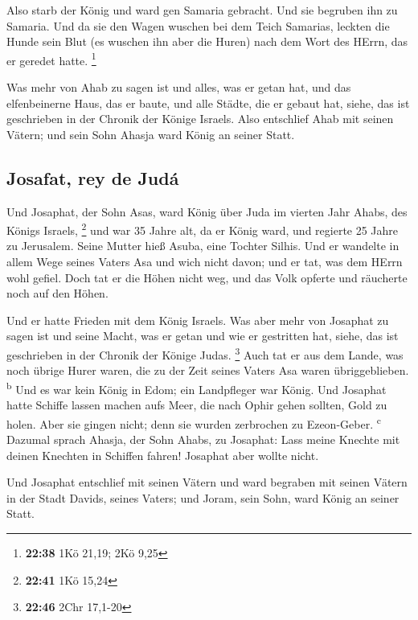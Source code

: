  Also starb der König und ward gen Samaria gebracht. Und
sie begruben ihn zu Samaria.  Und da sie den Wagen
wuschen bei dem Teich Samarias, leckten die Hunde sein Blut (es wuschen
ihn aber die Huren) nach dem Wort des HErrn, das er geredet hatte.
\footnote{\textbf{22:38} 1Kö 21,19; 2Kö 9,25}

 Was mehr von Ahab zu sagen ist und alles, was er getan
hat, und das elfenbeinerne Haus, das er baute, und alle Städte, die er
gebaut hat, siehe, das ist geschrieben in der Chronik der Könige
Israels.  Also entschlief Ahab mit seinen Vätern; und
sein Sohn Ahasja ward König an seiner Statt.

\hypertarget{josafat-rey-de-juduxe1}{%
\subsection{Josafat, rey de Judá}\label{josafat-rey-de-juduxe1}}

 Und Josaphat, der Sohn Asas, ward König über Juda im
vierten Jahr Ahabs, des Königs Israels, \footnote{\textbf{22:41} 1Kö
  15,24}  und war 35 Jahre alt, da er König ward, und
regierte 25 Jahre zu Jerusalem. Seine Mutter hieß Asuba, eine Tochter
Silhis.  Und er wandelte in allem Wege seines Vaters Asa
und wich nicht davon; und er tat, was dem HErrn wohl gefiel.
 Doch tat er die Höhen nicht weg, und das Volk opferte
und räucherte noch auf den Höhen.

 Und er hatte Frieden mit dem König Israels.
 Was aber mehr von Josaphat zu sagen ist und seine Macht,
was er getan und wie er gestritten hat, siehe, das ist geschrieben in
der Chronik der Könige Judas. \footnote{\textbf{22:46} 2Chr 17,1-20}
 Auch tat er aus dem Lande, was noch übrige Hurer waren,
die zu der Zeit seines Vaters Asa waren übriggeblieben.
\textsuperscript{b}  Und es war kein König in Edom; ein
Landpfleger war König.  Und Josaphat hatte Schiffe lassen
machen aufs Meer, die nach Ophir gehen sollten, Gold zu holen. Aber sie
gingen nicht; denn sie wurden zerbrochen zu Ezeon-Geber.
\textsuperscript{c}  Dazumal sprach Ahasja, der Sohn
Ahabs, zu Josaphat: Lass meine Knechte mit deinen Knechten in Schiffen
fahren! Josaphat aber wollte nicht.

 Und Josaphat entschlief mit seinen Vätern und ward
begraben mit seinen Vätern in der Stadt Davids, seines Vaters; und
Joram, sein Sohn, ward König an seiner Statt.

